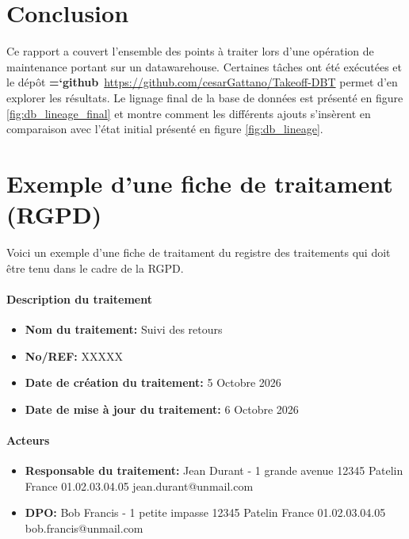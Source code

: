 \documentclass[11pt]{article}
\newcommand{\techno}[1]{{\ttfamily\bfseries\hyphenchar\font=`\-\color{Sienna}#1}}
\newcommand{\github}{\techno{github}}
\begin{document}
\section{Conclusion}

Ce rapport a couvert l'ensemble des points à traiter lors d'une opération de maintenance portant sur un datawarehouse. Certaines tâches ont été exécutées et le dépôt \github\ \url{https://github.com/cesarGattano/Takeoff-DBT} permet d'en explorer les résultats. Le lignage final de la base de données
est présenté en figure \ref{fig:db_lineage_final} et montre comment les différents ajouts s'insèrent en comparaison avec l'état initial présenté en figure \ref{fig:db_lineage}.




















\pagebreak
\appendix

\section{Exemple d'une fiche de traitament (RGPD)} \label{ann:fiche_traitement}

Voici un exemple d'une fiche de traitament du registre des traitements
qui doit être tenu dans le cadre de la RGPD.

\paragraph{Description du traitement}
\begin{itemize}
    \item {\bf Nom du traitement:} Suivi des retours
    \item {\bf No/REF:} XXXXX
    \item {\bf Date de création du traitement:} 5 Octobre 2026
    \item {\bf Date de mise à jour du traitement:} 6 Octobre 2026
\end{itemize}

\paragraph{Acteurs}
\begin{itemize}
    \item {\bf Responsable du traitement:} Jean Durant - 1 grande avenue 12345 Patelin France 01.02.03.04.05 jean.durant@unmail.com
    \item {\bf DPO:} Bob Francis - 1 petite impasse 12345 Patelin France 01.02.03.04.05 bob.francis@unmail.com
\end{itemize}
\end{document}
